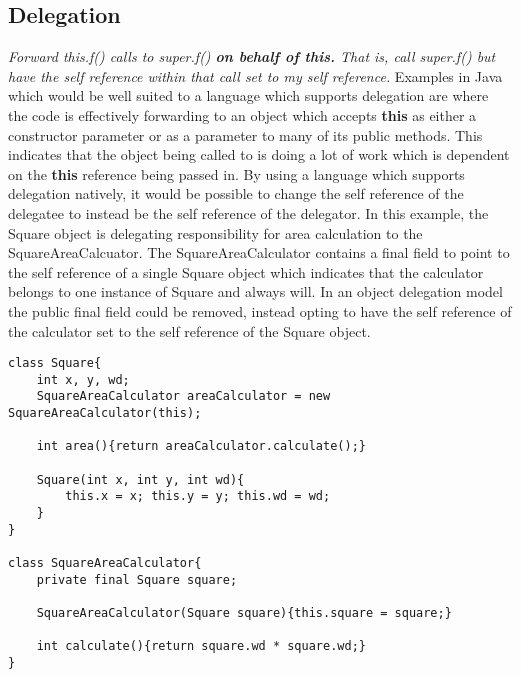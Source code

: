 \subsection{Delegation}
\textit{Forward this.f() calls to super.f() \textbf{on behalf of this.}
That is, call super.f() but have the self reference within that call set to my self reference.}\newline\newline
Examples in Java which would be well suited to a language which supports delegation are where the code is effectively forwarding to an object which accepts \textbf{this} as either a constructor parameter or as a parameter to many of its public methods. This indicates that the object being called to is doing a lot of work which is dependent on the \textbf{this} reference being passed in. By using a language which supports delegation natively, it would be possible to change the self reference of the delegatee to instead be the self reference of the delegator.\newline
In this example, the Square object is delegating responsibility for area calculation to the SquareAreaCalcuator. The SquareAreaCalculator contains a final field to point to the self reference of a single Square object which indicates that the calculator belongs to one instance of Square and always will. In an object delegation model the public final field could be removed, instead opting to have the self reference of the calculator set to the self reference of the Square object.
\begin{lstlisting}
class Square{
	int x, y, wd;
	SquareAreaCalculator areaCalculator = new SquareAreaCalculator(this);
	
	int area(){return areaCalculator.calculate();}
	
	Square(int x, int y, int wd){
		this.x = x; this.y = y; this.wd = wd;
	}
}

class SquareAreaCalculator{
	private final Square square;
	
	SquareAreaCalculator(Square square){this.square = square;}
	
	int calculate(){return square.wd * square.wd;}
}
\end{lstlisting}

